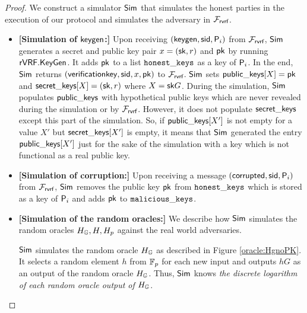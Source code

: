 \begin{proof}
	We construct a simulator $ \mathsf{Sim} $ that simulates the honest parties in the execution of our protocol and simulates the adversary in $ \mathcal{F}_{\textsf{rvrf}} $. 
	\begin{itemize}
		
		\item \textbf{[Simulation of $ \mathsf{keygen} $:]} Upon receiving $(\mathsf{keygen}, \textsf{sid}, \mathsf{P}_i)$ from $\mathcal{F}_{\textsf{rvrf}}$, $ \mathsf{Sim} $ generates  a secret and public key pair $ x = (\mathsf{sk},r)$ and $\mathsf{pk} $ by running $ {\mathsf{rVRF}}.{\mathsf{KeyGen}} $. It adds $ \mathsf{pk} $ to a list $ \mathtt{honest\_keys} $  as a key of $ \mathsf{P}_i $.
		In the end, $ \mathsf{Sim} $ returns $(\mathsf{verificationkey}, \textsf{sid}, x,\mathsf{pk})$ to $\mathcal{F}_{\textsf{rvrf}}$. 
		$ \mathsf{Sim} $ sets $ {\mathsf{public\_keys}}[X] = \mathsf{pk}$ and $ {\mathsf{secret\_keys}}[X] =(\mathsf{sk},r) $ where $ X = \mathsf{sk} G $.
		During the simulation, $ \mathsf{Sim} $ populates $ {\mathsf{public\_keys}} $ with hypothetical public keys which are never revealed during the simulation or by $ \mathcal{F}_{\textsf{rvrf}} $. However, it does not populate $ {\mathsf{secret\_keys}} $ except this part of the simulation. So, if  $ {\mathsf{public\_keys}}[X'] $ is not empty for a value $ X' $ but $ {\mathsf{secret\_keys}}[X'] $ is empty, it means that $ \mathsf{Sim} $ generated the entry $ {\mathsf{public\_keys}}[X'] $ just for the sake of the simulation with a key which is not  functional as a real public key.
		
		\item \textbf{[Simulation of corruption:]} Upon receiving a message $ (\mathsf{corrupted}, \textsf{sid}, \mathsf{P}_i) $ from $ \mathcal{F}_{\textsf{rvrf}} $, $ \mathsf{Sim} $ removes the public key $ \mathsf{pk} $ from $ \mathtt{honest\_keys} $ which is stored as a key of $ \mathsf{P}_i $ and adds $ \mathsf{pk} $ to $ \mathtt{malicious\_keys} $.
		
		\item\textbf{[Simulation of the random oracles:]} We  describe how $ \mathsf{Sim} $ simulates the random oracles $ H_{\mathbb{G}}, H, H_p $ against the real world adversaries. 	
		
		$ \mathsf{Sim} $ simulates the random oracle $ H_{\mathbb{G}} $ as described in Figure \ref{oracle:HgnoPK}. It selects a random element  $ h $ from $ \mathbb{F}_p $ for each new input and outputs $ hG $ as an output of the random oracle $ H_{\mathbb{G}} $. Thus, $ \mathsf{Sim} $ knows \emph{the discrete logarithm of each random oracle output of $H_{\mathbb{G}}  $}. 
		

\end{itemize}
\end{proof}
